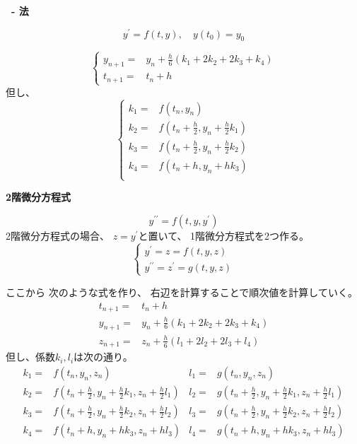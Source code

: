 \documentclass[12pt,b5paper]{ltjsarticle}
\begin{document}
\hrulefill
\textbf{
  \ -
  法}
\hrulefill

\begin{equation}
 y^{\prime} = f(t,y), \quad y(t_0)=y_0
\end{equation}

\begin{equation}
 \begin{cases}
  y_{n+1} =& y_{n} + \frac{h}{6}(k_{1}+2k_{2}+2k_{3}+k_{4})\\
  t_{n+1} =& t_{n}+h
 \end{cases}
\end{equation}
但し、
\begin{equation}
 \begin{cases}
  k_{1} =& f(t_{n},y_{n})\\
  k_{2} =& f(t_{n}+\frac{h}{2},y_{n}+\frac{h}{2}k_{1})\\
  k_{3} =& f(t_{n}+\frac{h}{2},y_{n}+\frac{h}{2}k_{2})\\
  k_{4} =& f(t_{n}+h,y_{n}+hk_{3})\\
 \end{cases}
\end{equation}

\dotfill



\textbf{2階微分方程式}

\begin{equation}
 y^{\prime\prime} = f(t,y,y^{\prime})
\end{equation}
2階微分方程式の場合、
$z=y^{\prime}$と置いて、
1階微分方程式を2つ作る。
\begin{equation}
 \begin{cases}
  y^{\prime} = z = f(t,y,z)\\
  y^{\prime\prime} = z^{\prime} = g(t,y,z)
 \end{cases}
\end{equation}

ここから
次のような式を作り、
右辺を計算することで順次値を計算していく。
\begin{align}
 t_{n+1} =& t_{n}+h\\
 y_{n+1} =& y_{n} + \frac{h}{6}(k_{1}+2k_{2}+2k_{3}+k_{4})\\
 z_{n+1} =& z_{n} + \frac{h}{6}(l_{1}+2l_{2}+2l_{3}+l_{4})
\end{align}
但し、係数$k_{i},l_{i}$は次の通り。
 \begin{align}
  k_{1} =& f(t_{n},y_{n},z_{n})&
  l_{1} =& g(t_{n},y_{n},z_{n})\\
  k_{2} =& f\left(t_{n}+\frac{h}{2},y_{n}+\frac{h}{2}k_{1},z_{n}+\frac{h}{2}l_{1}\right)&
  l_{2} =& g\left(t_{n}+\frac{h}{2},y_{n}+\frac{h}{2}k_{1},z_{n}+\frac{h}{2}l_{1}\right)\\
  k_{3} =& f\left(t_{n}+\frac{h}{2},y_{n}+\frac{h}{2}k_{2},z_{n}+\frac{h}{2}l_{2}\right)&
  l_{3} =& g\left(t_{n}+\frac{h}{2},y_{n}+\frac{h}{2}k_{2},z_{n}+\frac{h}{2}l_{2}\right)\\
  k_{4} =& f(t_{n}+h,y_{n}+hk_{3},z_{n}+hl_{3})&
  l_{4} =& g(t_{n}+h,y_{n}+hk_{3},z_{n}+hl_{3})
 \end{align}
\end{document}
